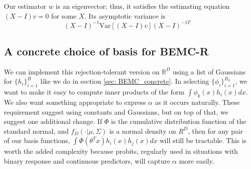 \documentclass{article}
\begin{document}
Our estimator $w$ is an eigenvector; thus, it satisfies the estimating equation $(X - I)v = 0$ for some $X$. Its asymptotic variance is 
$$(X - I)^{-1}\mathrm{Var}[(X - I)v](X - I)^{-1T}$$

\subsection{A concrete choice of basis for BEMC-R}
\label{sec:BEMC-R_concrete}

We can implement this rejection-tolerant version on $\mathbb{R}^D$ using a list of Gaussians for $\{h_i\}_{i=1}^B$ like we do in section \ref{sec: BEMC_concrete}. In selecting $\{\phi_i\}_{i=1}^{B_\phi}$, we want to make it easy to compute inner products of the form $\int \phi_k(x)h_i(x)dx$. We also want something appropriate to express $\alpha$ as it occurs naturally. These requirement suggest using constants and Gaussians, but on top of that, we suggest one additional change. If $\Phi$ is the cumulative distribution function of the standard normal, and $f_D(\cdot|\mu, \Sigma)$ is a normal density on $R^D$, then for any pair of our basis functions, $\int \Phi(\theta ^T x)h_i(x)h_j(x)dx$ will still be tractable. This is worth the added complexity because probits, regularly used in situations with binary response and continuous predictors, will capture $\alpha$ more easily. 
\end{document}
